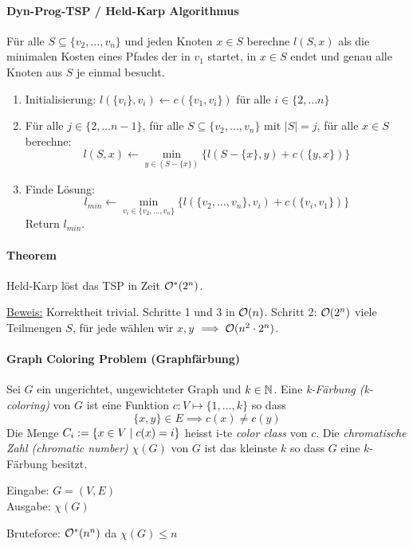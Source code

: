 \paragraph{Dyn-Prog-TSP / Held-Karp Algorithmus}
{ %
\newcommand{\vtwon}{\{v_2, \dots, v_n\}}
Für alle $S \subseteq \vtwon$ und jeden Knoten $x \in S$ berechne $l(S, x)$ als die minimalen Kosten
eines Pfades der in $v_1$ startet, in $x \in S$ endet und genau alle Knoten aus $S$ je einmal besucht.

\begin{enumerate}
    \item Initialisierung: $ l(\{v_i\}, v_i) \leftarrow c(\{v_1, v_i\})$ für alle $i \in \{2, \dots n\}$
    \item Für alle $j \in \{2, \dots n-1\}$, für alle $S \subseteq \vtwon$ mit $|S|=j$,
    für alle $x \in S$ berechne:
    $$ l(S, x) \leftarrow \min_{y \in (S-\{x\})} \{ l(S-\{x\},y) + c(\{y,x\}) \} $$
    \item Finde Lösung: $$ l_{min} \leftarrow \min_{v_i \in \vtwon} \{ l(\vtwon,v_i) + c(\{v_i,v_1\}) \} $$
    Return $l_{min}$.
\end{enumerate}
}

\paragraph{Theorem}
Held-Karp löst das TSP in Zeit $\mathcal{O}^* (2^n)$.

\underline{Beweis:}
Korrektheit trivial.
Schritte 1 und 3 in $\mathcal{O}(n)$.
Schritt 2: $\mathcal{O}(2^n)$ viele Teilmengen $S$, für jede wählen wir $x,y$ $\implies \mathcal{O}(n^2 \cdot 2^n)$.

\paragraph{Graph Coloring Problem (Graphfärbung)}
Sei $G$ ein ungerichtet, ungewichteter Graph und $k \in \mathbb{N}$.
Eine \emph{k-Färbung (k-coloring)} von $G$ ist eine Funktion $c : V \mapsto \{1, \dots, k\}$ so dass
$$ \{x,y\} \in E \implies c(x) \neq c(y) $$
Die Menge $C_i := \{ x \in V \; | \; c(x) = i \}$ heisst i-te \emph{color class} von $c$.
Die \emph{chromatische Zahl (chromatic number)} $\chi(G)$ von $G$ ist das kleinste $k$ so dass $G$ eine $k$-Färbung besitzt.

Eingabe: $G=(V,E)$ \\
Ausgabe: $\chi(G)$

Bruteforce: $\mathcal{O}^*(n^n)$ da $\chi(G) \leq n$

